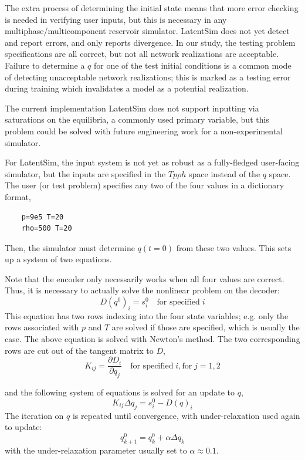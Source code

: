\documentclass[]{article}
\begin{document}
The extra process of determining the initial state means that more error checking is needed
in verifying user inputs, but this is necessary in any
multiphase/multicomponent reservoir simulator. LatentSim does not yet
detect and report errors, and only reports divergence. In our study, the
testing problem specifications are all correct, but not all network
realizations are acceptable. Failure to determine a \(q\) for one of the
test initial conditions is a common mode of detecting unacceptable
network realizations; this is marked as a testing error during training
which invalidates a model as a potential realization.

The current implementation LatentSim does not support inputting via
saturations on the equilibria, a commonly used primary variable, but
this problem could be solved with future engineering work for a
non-experimental simulator.

For LatentSim, the input system is not yet as robust as a
fully-fledged user-facing simulator, but the inputs are specified in
the $T p \rho h$ space instead of the $q$ space.
The user (or test problem) specifies any two of the four values in a
dictionary format,
\begin{verbatim}
    p=9e5 T=20
    rho=500 T=20
\end{verbatim}
Then, the simulator must determine $q(t=0)$ from these two
values. This sets up a system of two equations.

Note that the encoder only necessarily works when all four values are
correct. Thus, it is necessary to actually solve the nonlinear problem
on the decoder:
\begin{equation}
  D(q^0)_i = s^0_i \quad \text{for specified}\; i
\end{equation}
This equation has two rows indexing into the four state variables;
e.g. only the rows associated with $p$ and $T$ are solved if those are
specified, which is usually the case. The above equation is solved
with Newton's method. The two corresponding rows are cut out of
the tangent matrix to $D$,
\begin{equation}
K_{ij} = \frac{\partial D_i}{\partial q_j}  \quad \text{for
    specified}\; i, \text{for}\;j=1,2
\end{equation}

and the following system of equations is solved for an update to $q$,
\begin{equation}
K_{ij}\Delta q_j = s^0_i-D(q)_i
\end{equation}
The iteration on $q$ is repeated until convergence, with under-relaxation used again to update:
 \begin{equation}
q^0_{k+1} =q^0_{k} + \alpha \Delta q_{k}
\end{equation}
with the under-relaxation parameter usually set to $\alpha \approx
0.1$.
\end{document}
